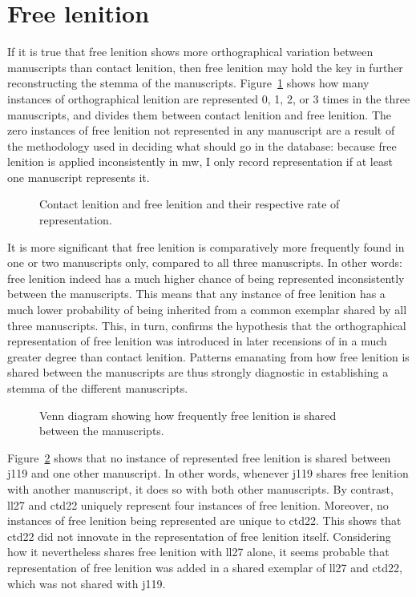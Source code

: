 \section{Free lenition}
\label{sec:points-where-one}
If it is true that free lenition shows more orthographical variation between manuscripts than contact lenition, then free lenition may hold the key in further reconstructing the stemma of the manuscripts. Figure~\ref{fig:contfreelendewi} shows how many instances of orthographical lenition are represented 0, 1, 2, or 3 times in the three manuscripts, and divides them between contact lenition and free lenition. The zero instances of free lenition not represented in any manuscript are a result of the methodology used in deciding what should go in the database: because free lenition is applied inconsistently in \gls{mw}, I only record representation if at least one manuscript represents it.

\begin{figure}[h]
  \centering
  
  \caption{Contact lenition and free lenition and their respective rate of representation.}
  \label{fig:contfreelendewi}
\end{figure}

It is more significant that free lenition is comparatively more frequently found in one or two manuscripts only, compared to all three manuscripts. In other words: free lenition indeed has a much higher chance of being represented inconsistently between the manuscripts. This means that any instance of free lenition has a much lower probability of being inherited from a common exemplar shared by all three manuscripts. This, in turn, confirms the hypothesis that the orthographical representation of free lenition was introduced in later recensions of  in a much greater degree than contact lenition. Patterns  emanating from how free lenition is shared between the manuscripts are thus strongly diagnostic in establishing a stemma of the different manuscripts.

\begin{figure}[h]
  \centering
  
  \caption{Venn diagram showing how frequently free lenition is shared between  the manuscripts.}
  \label{fig:vennfreelendewi}
\end{figure}
Figure~\ref{fig:vennfreelendewi} shows that no instance of represented free lenition  is shared between \gls{j119} and one other manuscript. In other words, whenever \gls{j119} shares free lenition with another manuscript, it does so with both other manuscripts. By contrast, \gls{ll27} and \gls{ctd22} uniquely represent four instances of free lenition. Moreover, no instances of free lenition being represented are unique to \gls{ctd22}. This shows that \gls{ctd22} did not innovate in the representation of free lenition itself. Considering how it nevertheless shares free lenition with \gls{ll27} alone, it seems probable that representation of free lenition was added in a shared exemplar of \gls{ll27} and \gls{ctd22}, which was not shared with \gls{j119}.


